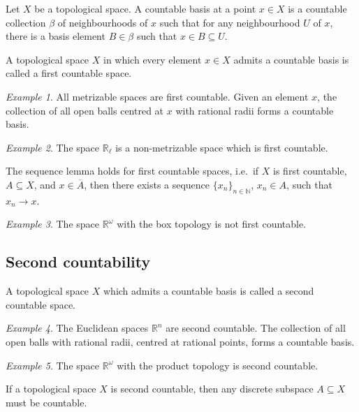 \documentclass[11pt]{article}
\newcommand{\R}{\mathbb{R}}
\newcommand{\N}{\mathbb{N}}
\theoremstyle{definition}
\theoremstyle{remark}
\newtheorem*{example}{Example}
\numberwithin{equation}{section}
\begin{document}
    \begin{definition}
        Let $X$ be a topological space. A countable basis at a point $x \in X$ is a
        countable collection $\beta$ of neighbourhoods of $x$ such that for any
        neighbourhood $U$ of $x$, there is a basis element $B \in \beta$ such that $x
        \in B \subseteq U$.
    \end{definition}

    \begin{definition}
        A topological space $X$ in which every element $x \in X$ admits a countable
        basis is called a first countable space.
    \end{definition}
    \begin{example}
        All metrizable spaces are first countable. Given an element $x$, the
        collection of all open balls centred at $x$ with rational radii forms a
        countable basis.
    \end{example}
    \begin{example}
        The space $\R_\ell$ is a non-metrizable space which is first countable.
    \end{example}
    
    \begin{lemma}
        The sequence lemma holds for first countable spaces, i.e.\ if $X$ is first
        countable, $A \subseteq X$, and $x \in \overline{A}$, then there exists a
        sequence $\{x_n\}_{n \in \N}$, $x_n \in A$, such that $x_n \to x$.
    \end{lemma}

    \begin{example}
        The space $\R^\omega$ with the box topology is not first countable.
    \end{example}


    \subsection{Second countability}
    
    \begin{definition}
        A topological space $X$ which admits a countable basis is called a second
        countable space.
    \end{definition}
    \begin{example}
        The Euclidean spaces $\R^n$ are second countable. The collection of all open
        balls with rational radii, centred at rational points, forms a countable basis.
    \end{example}
    \begin{example}
        The space $\R^\omega$ with the product topology is second countable.
    \end{example}
    \begin{lemma}
        If a topological space $X$ is second countable, then any discrete subspace
        $A\subseteq X$ must be countable.
    \end{lemma}
\end{document}

